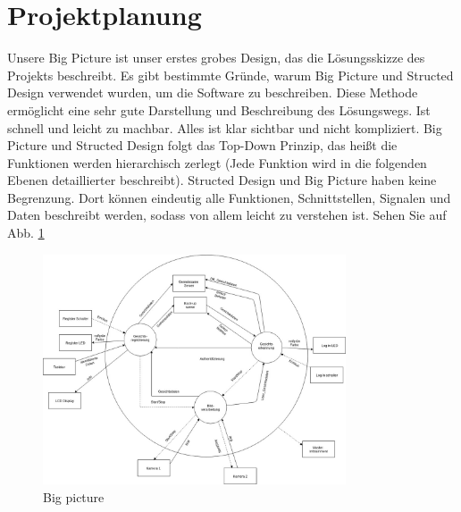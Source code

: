 \section{Projektplanung}
\begin{flushleft}
	Unsere Big Picture ist unser erstes grobes Design, das die Lösungsskizze des Projekts beschreibt. Es gibt bestimmte Gründe, warum Big Picture und Structed Design verwendet wurden, um die Software zu beschreiben. Diese Methode ermöglicht eine sehr gute Darstellung und Beschreibung des Lösungswegs. Ist schnell und leicht zu machbar. Alles ist klar sichtbar und nicht kompliziert. Big Picture und Structed Design folgt das Top-Down Prinzip, das heißt die Funktionen werden hierarchisch zerlegt (Jede Funktion wird in die folgenden Ebenen detaillierter beschreibt). Structed Design und Big Picture haben keine Begrenzung. Dort können eindeutig alle Funktionen, Schnittstellen, Signalen und Daten beschreibt werden, sodass von allem leicht zu verstehen ist. Sehen Sie auf Abb. \ref{fig:bigpicture}
\end{flushleft}
\begin{figure}[ht]
	\includegraphics[width=0.8\textwidth]{./figures/Big_Picture.jpg}
	\centering
	\caption{Big picture}
	\label{fig:bigpicture}
\end{figure}

